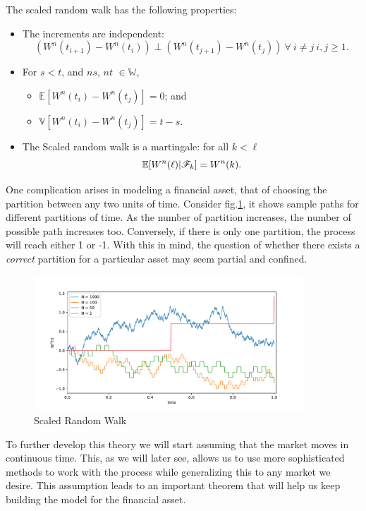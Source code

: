 \documentclass[../TGMAFFIRO]{subfiles}
\begin{document}
\begin{remark}
	The scaled random walk has the following properties:
	\begin{itemize}
		\item The increments are independent: \[\left(W^n(t_{i+1}) - W^n(t_{i})\right) \perp \left(W^n(t_{j+1}) - W^n(t_{j})\right) \ \forall \ i \neq j \ i, j \geq 1.\]
		\item For $s < t$, and $ns$,  $nt$ $\in \mathbb{W}$, 
		\begin{itemize}
			\item $\mathbb{E}[W^n(t_{i}) - W^n(t_{j})] = 0$; and
			\item $\mathbb{V}[W^n(t_{i}) - W^n(t_{j})] = t - s$.
		\end{itemize}
		\item The Scaled random walk is a martingale: for all $k < \ell$
		\[\mathbb{E}[W^n(\ell) | \mathscr{F}_k] = W^n(k).\]
	\end{itemize}
\end{remark}

One complication arises in modeling a financial asset, that of choosing the partition between any two units of time. Consider fig.\ref{fig:scaled_random_walk}, it shows sample paths for different partitions of time. As the number of partition increases, the number of possible path increases too. Conversely, if there is only one partition, the process will reach either 1 or -1. With this in mind, the question of whether there exists a \textit{correct} partition for a particular asset may seem partial and confined.\\

\begin{figure}[h]
	\label{fig:scaled_random_walk}
	\centering
	\includegraphics[width=0.9\textwidth]{../images/scaled_random_walk}
	\caption{Scaled Random Walk}
\end{figure}


To further develop this theory we will start assuming that the market moves in continuous time. This, as we will later see, allows us to use more sophisticated methods to work with the process while generalizing this to any market we desire. This assumption leads to an important theorem that will help us keep building the model for the financial asset.
\end{document}

